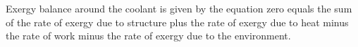 Exergy balance around the coolant is given by the equation zero equals the sum of the rate of exergy due to structure plus the rate of exergy due to heat minus the rate of work minus the rate of exergy due to the environment.